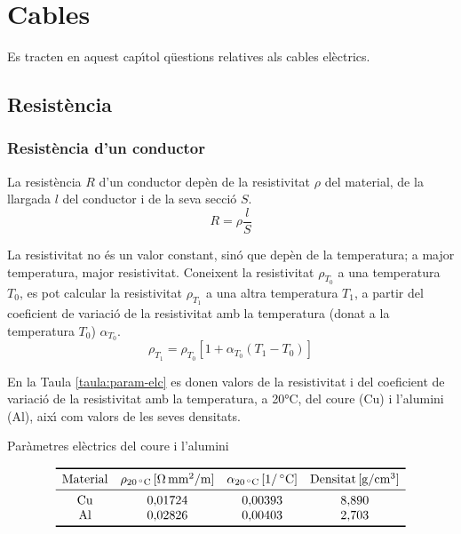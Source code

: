 \chapter{Cables}

Es tracten en aquest cap\'{\i}tol q\"{u}estions relatives als cables el\`{e}ctrics.

\section{Resist\`{e}ncia}

\subsection{Resist\`{e}ncia d'un conductor}

La resist\`{e}ncia $R$ d'un conductor dep\`{e}n de la resistivitat $\rho$
del material, de la llargada $l$ del conductor i de la seva secci\'{o}
$S$.
\begin{equation}
   R= \rho \frac{l}{S}
\end{equation}

La resistivitat no
\'{e}s un valor constant, sin\'{o} que dep\`{e}n de la temperatura; a major
temperatura, major resistivitat. Coneixent la resistivitat $\rho_{T_0}$ a una
temperatura $T_0$, es pot calcular la resistivitat $\rho_{T_1}$ a una altra
temperatura $T_1$, a partir del coeficient de variaci\'{o} de la
resistivitat amb la temperatura (donat a la temperatura $T_0$)
$\alpha_{T_0}$.
\begin{equation}
   \rho_{T_1} = \rho_{T_0} [1 + \alpha_{T_0} (T_1 - T_0)]
\end{equation}

En la Taula
\vref{taula:param-elc} es donen valors de la resistivitat i del
coeficient de variaci\'{o} de la resistivitat amb la temperatura, a
20\unit{\celsius}, del coure (Cu) i l'alumini (Al), aix\'{\i} com valors
de les seves densitats.
\begin{table}[htb]
   \caption{\label{taula:param-elc} Par\`{a}metres el\`{e}ctrics del coure i l'alumini}
   \[ \begin{array}{cccc}
   \toprule[1pt]
   \text{Material} & \rho_{20\unit{\celsius}}\unit{[\ohm\,mm^2/m]} & \alpha_{20\unit{\celsius}}\unit{[1/\,\celsius]} & \text{Densitat}\unit{[g/cm^3] }
   \\
   \midrule
   \text{Cu} & 0{,}01724 & 0{,}00393 & 8{,}890 \\
   \text{Al} & 0{,}02826 & 0{,}00403 & 2{,}703 \\
   \bottomrule[1pt]
   \end{array}   \]
\end{table}


